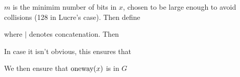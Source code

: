 \documentclass[a4paper,titlepage]{article}
\begin{document}

$m$ is the minimim number of bits in $x$, chosen to be large
enough to avoid collisions (128 in Lucre's case). Then define


where $|$ denotes concatenation. Then


In case it isn't obvious, this ensures that


We then ensure that $\textrm{oneway}(x)$ is in $G$

\end{document}
